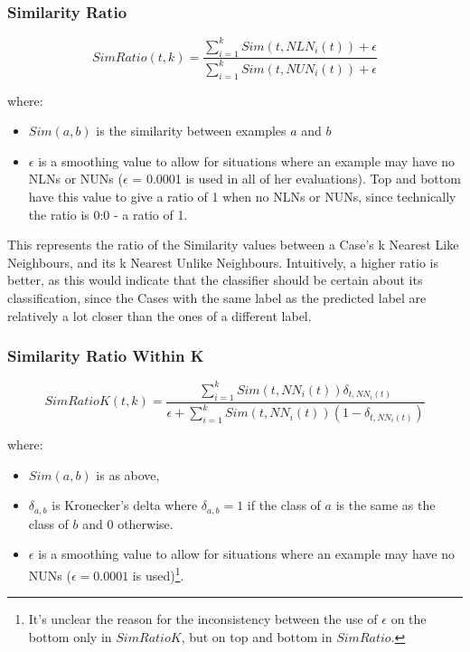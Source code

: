 \documentclass[a4paper,11pt]{report}
\begin{document}
\begin{samepage}

\subsubsection{Similarity Ratio}
\[
SimRatio(t,k)=\frac{\sum_{i=1}^{k}Sim(t,NLN_{i}(t))+\epsilon}{\sum_{i=1}^{k}Sim(t,NUN_{i}(t))+\epsilon}
\]

where:
\begin{itemize}
	\item $Sim(a, b)$ is the similarity between examples $a$ and $b$ 
	\item $\epsilon$ is a smoothing value to allow for situations where an example may have no NLNs or NUNs ($\epsilon$ = 0.0001 is used in all of her evaluations). Top and bottom have this value to give a ratio of 1 when no NLNs or NUNs, since technically the ratio is 0:0 - a ratio of 1.
\end{itemize}

This represents the ratio of the Similarity values between a Case's k Nearest Like Neighbours, and its k Nearest Unlike Neighbours. Intuitively, a higher ratio is better, as this would indicate that the classifier should be certain about its classification, since the Cases with the same label as the predicted label are relatively a lot closer than the ones of a different label.

\end{samepage}

\subsubsection{Similarity Ratio Within K}
\[
SimRatioK(t,k)=\frac{\sum_{i=1}^{k}Sim(t,NN_{i}(t))\delta_{t,NN_{i}(t)}}{\epsilon+\sum_{i=1}^{k}Sim(t,NN_{i}(t))(1-\delta_{t,NN_{i}(t)})}
\]

where:
\begin{itemize}
	\item $Sim(a, b)$ is as above, 
	\item $\delta_{a, b}$ is Kronecker's delta where $\delta_{a, b}=1$ if the class of $a$ is the same as the class of $b$ and $0$ otherwise. 
	\item $\epsilon$ is a smoothing value to allow for situations where an example may have no NUNs ($\epsilon = 0.0001$ is used)\footnote{It's unclear the reason for the inconsistency between the use of $\epsilon$ on the bottom only in $SimRatioK$, but on top and bottom in $SimRatio$.}.
\end{itemize}
\end{document}
